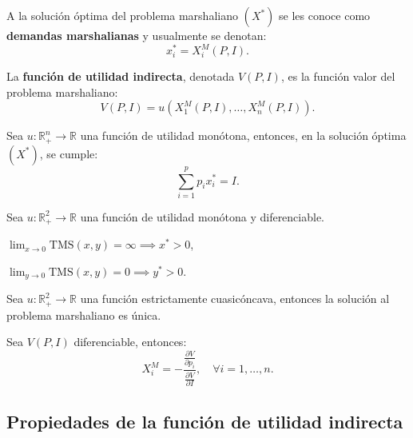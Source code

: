 \documentclass[8pt,a4paper]{extarticle}
\begin{document}
\begin{multicols}{3}
	\begin{boxdef}
		A la solución óptima del problema marshaliano $(X^*)$ se les conoce como \textbf{demandas marshalianas} y usualmente se denotan:
		\[
			x_i^* = X_i^M (P, I)
			.\]
	\end{boxdef}

	\begin{boxdef}
		La \textbf{función de utilidad indirecta}, denotada $V(P, I)$, es la función valor del problema marshaliano:
		\[
			V(P, I) = u(X_1^M(P, I), \ldots, X_n^M(P, I))
			.\]
	\end{boxdef}

	\begin{boxtheo}
		Sea $u : \mathbb{R}^n_+ \to \mathbb{R}$ una función de utilidad monótona, entonces, en la solución óptima $(X^*)$, se cumple:
		\[
			\sum_{i=1}^{p} p_i x_i^* = I
			.\]
	\end{boxtheo}

	\begin{boxtheo}
		Sea $u : \mathbb{R}^2_+ \to \mathbb{R}$ una función de utilidad monótona y diferenciable.
		\begin{eqlist}
			\item $\displaystyle \lim_{x \to 0} \text{TMS} (x, y) = \infty \implies x^* > 0$,
			\item $\displaystyle \lim_{y \to 0} \text{TMS} (x, y) = 0 \implies y^* > 0$.
		\end{eqlist}
	\end{boxtheo}

	\begin{boxtheo}
		Sea $u : \mathbb{R}^2_+ \to \mathbb{R}$ una función estrictamente cuasicóncava, entonces la solución al problema marshaliano es única.
	\end{boxtheo}

	\begin{boxlemma}
		Sea $V(P, I)$ diferenciable, entonces:
		\[
			X^M_i = - \frac{\displaystyle \frac{\partial V}{\partial p_{i}}}{ \displaystyle \frac{\partial V}{\partial I}}, \quad \forall i = 1, \ldots, n
			.\]
	\end{boxlemma}

	\subsection{Propiedades de la función de utilidad indirecta}


\end{multicols}
\end{document}
